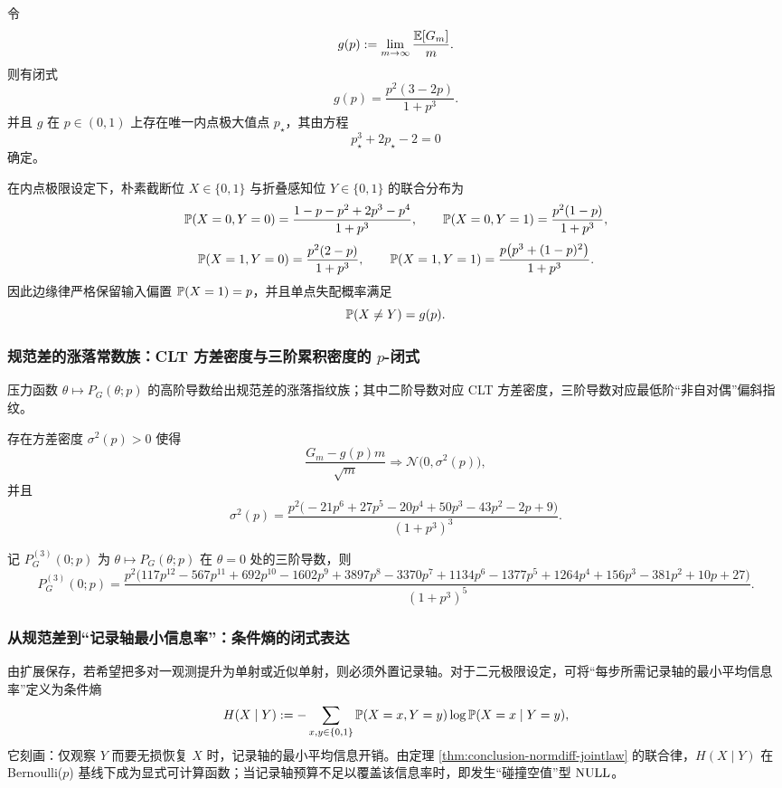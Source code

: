 \begin{theorem}[规范差密度曲线的闭式表达]\label{thm:conclusion-normdiff-density-closedform}
令
$$
g(p):=\lim_{m\to\infty}\frac{\mathbb{E}[G_m]}{m}.
$$
则有闭式
$$
g(p)=\frac{p^{2}(3-2p)}{1+p^{3}}.
$$
并且 $g$ 在 $p\in(0,1)$ 上存在唯一内点极大值点 $p_\star$，其由方程
$$
p_\star^{3}+2p_\star-2=0
$$
确定。
\end{theorem}

\begin{theorem}\label{thm:conclusion-normdiff-jointlaw}
在内点极限设定下，朴素截断位 $X\in\{0,1\}$ 与折叠感知位 $Y\in\{0,1\}$ 的联合分布为
$$
\mathbb{P}(X=0,Y=0)=\frac{1-p-p^{2}+2p^{3}-p^{4}}{1+p^{3}},\qquad
\mathbb{P}(X=0,Y=1)=\frac{p^{2}(1-p)}{1+p^{3}},
$$
$$
\mathbb{P}(X=1,Y=0)=\frac{p^{2}(2-p)}{1+p^{3}},\qquad
\mathbb{P}(X=1,Y=1)=\frac{p\bigl(p^{3}+(1-p)^{2}\bigr)}{1+p^{3}}.
$$
因此边缘律严格保留输入偏置 $\mathbb{P}(X=1)=p$，并且单点失配概率满足
$$
\mathbb{P}(X\neq Y)=g(p).
$$
\end{theorem}

\subsubsection{规范差的涨落常数族：CLT 方差密度与三阶累积密度的 $p$-闭式}
压力函数 $\theta\mapsto P_G(\theta;p)$ 的高阶导数给出规范差的涨落指纹族；其中二阶导数对应 CLT 方差密度，三阶导数对应最低阶“非自对偶”偏斜指纹。

\begin{theorem}\label{thm:conclusion-normdiff-clt-variance}
存在方差密度 $\sigma^{2}(p)>0$ 使得
$$
\frac{G_m-g(p)m}{\sqrt m}\Longrightarrow \mathcal N\bigl(0,\sigma^{2}(p)\bigr),
$$
并且
$$
\sigma^{2}(p)=
\frac{p^{2}\bigl(-21p^{6}+27p^{5}-20p^{4}+50p^{3}-43p^{2}-2p+9\bigr)}{(1+p^{3})^{3}}.
$$
\end{theorem}

\begin{theorem}[三阶累积密度]\label{thm:conclusion-normdiff-third-cumulant}
记 $P_G^{(3)}(0;p)$ 为 $\theta\mapsto P_G(\theta;p)$ 在 $\theta=0$ 处的三阶导数，则
$$
P_G^{(3)}(0;p)=
\frac{p^{2}\bigl(117p^{12}-567p^{11}+692p^{10}-1602p^{9}+3897p^{8}-3370p^{7}+1134p^{6}-1377p^{5}+1264p^{4}+156p^{3}-381p^{2}+10p+27\bigr)}{(1+p^{3})^{5}}.
$$
\end{theorem}

\subsubsection{从规范差到“记录轴最小信息率”：条件熵的闭式表达}
由扩展保存，若希望把多对一观测提升为单射或近似单射，则必须外置记录轴。对于二元极限设定，可将“每步所需记录轴的最小平均信息率”定义为条件熵
$$
H(X\mid Y):=-\sum_{x,y\in\{0,1\}}\mathbb{P}(X=x,Y=y)\log \mathbb{P}(X=x\mid Y=y),
$$
它刻画：仅观察 $Y$ 而要无损恢复 $X$ 时，记录轴的最小平均信息开销。由定理 \ref{thm:conclusion-normdiff-jointlaw} 的联合律，$H(X\mid Y)$ 在 Bernoulli($p$) 基线下成为显式可计算函数；当记录轴预算不足以覆盖该信息率时，即发生“碰撞空值”型 $\mathrm{NULL}$。

